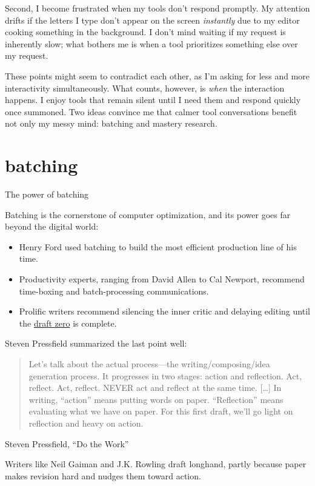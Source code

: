 \documentclass{article}
\begin{document}
Second, I become frustrated when my tools don’t respond promptly.
My attention drifts if the letters I type don't appear on the screen \emph{instantly}
due to my editor cooking something in the background.
I don't mind waiting if my request is inherently slow;
what bothers me is when a tool prioritizes something else over my request.

These points might seem to contradict each other,
as I'm asking for less and more interactivity simultaneously.
What counts, however, is \emph{when} the interaction happens.
I enjoy tools that remain silent until I need them
and respond quickly once summoned.
Two ideas convince me that calmer tool conversations benefit not only my messy mind:
batching and mastery research.

\section{batching}{The power of batching}

Batching is the cornerstone of computer optimization,
and its power goes far beyond the digital world:
\begin{itemize}
\item Henry Ford used batching to build the most efficient production line of his time.
\item Productivity experts, ranging from David Allen to Cal Newport,
recommend time-boxing and batch-processing communications.
\item Prolific writers recommend silencing the inner critic and delaying editing
until the \href{https://blog.reedsy.com/live/draft-zero-sj-watson/}{draft zero} is complete.
\end{itemize}

Steven Pressfield summarized the last point well:
  
\blockquote{
  Let's talk about the actual process—the writing/composing/idea generation process.
  It progresses in two stages: action and reflection.
  Act, reflect. Act, reflect.
  NEVER act and reflect at the same time. [\ldots]
  In writing, ``action'' means putting words on paper.
  ``Reflection'' means evaluating what we have on paper.
  For this first draft,
  we'll go light on reflection and heavy on action.
}{Steven Pressfield, ``Do the Work''}


Writers like Neil Gaiman and J.K. Rowling draft longhand,
partly because paper makes revision hard and nudges them toward action.
\end{document}
